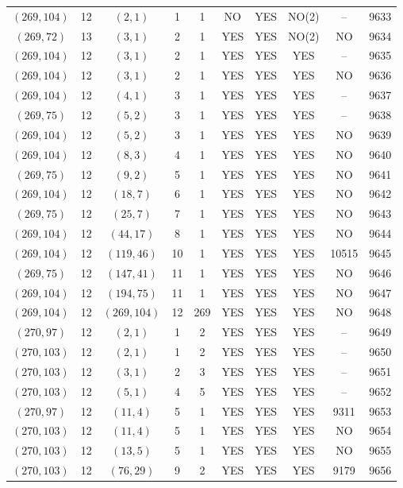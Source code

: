 \begin{longtable}{|c|c|c|c|c|c|c|c|c|c|}
$(269, 104)$ & 12 & $(2, 1)$ & 1 & 1 & NO & YES & NO(2) & -- & 9633\\
$(269, 72)$ & 13 & $(3, 1)$ & 2 & 1 & YES & YES & NO(2) & NO & 9634\\
$(269, 104)$ & 12 & $(3, 1)$ & 2 & 1 & YES & YES & YES & -- & 9635\\
$(269, 104)$ & 12 & $(3, 1)$ & 2 & 1 & YES & YES & YES & NO & 9636\\
$(269, 104)$ & 12 & $(4, 1)$ & 3 & 1 & YES & YES & YES & -- & 9637\\
$(269, 75)$ & 12 & $(5, 2)$ & 3 & 1 & YES & YES & YES & -- & 9638\\
$(269, 104)$ & 12 & $(5, 2)$ & 3 & 1 & YES & YES & YES & NO & 9639\\
$(269, 104)$ & 12 & $(8, 3)$ & 4 & 1 & YES & YES & YES & NO & 9640\\
$(269, 75)$ & 12 & $(9, 2)$ & 5 & 1 & YES & YES & YES & NO & 9641\\
$(269, 104)$ & 12 & $(18, 7)$ & 6 & 1 & YES & YES & YES & NO & 9642\\
$(269, 75)$ & 12 & $(25, 7)$ & 7 & 1 & YES & YES & YES & NO & 9643\\
$(269, 104)$ & 12 & $(44, 17)$ & 8 & 1 & YES & YES & YES & NO & 9644\\
$(269, 104)$ & 12 & $(119, 46)$ & 10 & 1 & YES & YES & YES & 10515 & 9645\\
$(269, 75)$ & 12 & $(147, 41)$ & 11 & 1 & YES & YES & YES & NO & 9646\\
$(269, 104)$ & 12 & $(194, 75)$ & 11 & 1 & YES & YES & YES & NO & 9647\\
$(269, 104)$ & 12 & $(269, 104)$ & 12 & 269 & YES & YES & YES & NO & 9648\\
$(270, 97)$ & 12 & $(2, 1)$ & 1 & 2 & YES & YES & YES & -- & 9649\\
$(270, 103)$ & 12 & $(2, 1)$ & 1 & 2 & YES & YES & YES & -- & 9650\\
$(270, 103)$ & 12 & $(3, 1)$ & 2 & 3 & YES & YES & YES & -- & 9651\\
$(270, 103)$ & 12 & $(5, 1)$ & 4 & 5 & YES & YES & YES & -- & 9652\\
$(270, 97)$ & 12 & $(11, 4)$ & 5 & 1 & YES & YES & YES & 9311 & 9653\\
$(270, 103)$ & 12 & $(11, 4)$ & 5 & 1 & YES & YES & YES & NO & 9654\\
$(270, 103)$ & 12 & $(13, 5)$ & 5 & 1 & YES & YES & YES & NO & 9655\\
$(270, 103)$ & 12 & $(76, 29)$ & 9 & 2 & YES & YES & YES & 9179 & 9656\\

\end{longtable}
